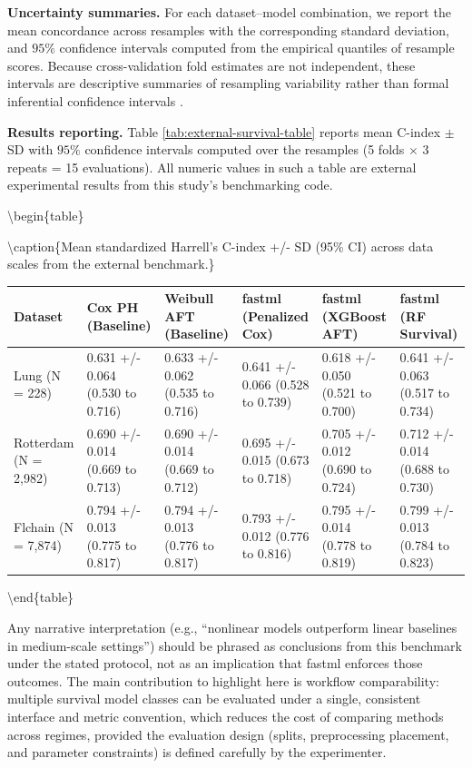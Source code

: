 \textbf{Uncertainty summaries.}
For each dataset--model combination, we report the mean concordance across resamples with the corresponding standard deviation, and \(95\%\) confidence intervals computed from the empirical quantiles of resample scores. Because cross-validation fold estimates are not independent, these intervals are descriptive summaries of resampling variability rather than formal inferential confidence intervals \citep{Bengio:2004aa}.

\textbf{Results reporting.}
Table \ref{tab:external-survival-table} reports mean C-index \(\pm\) SD with \(95\%\) confidence intervals computed over the resamples (5 folds \(\times\) 3 repeats = 15 evaluations). All numeric values in such a table are external experimental results from this study's benchmarking code.

\textbackslash begin\{table\}

\textbackslash caption\{\label{tab:external-survival-table}Mean standardized Harrell's C-index +/- SD (95\% CI) across data scales from the external benchmark.\}
\centering

\begin{tabular}[t]{llllll}
\toprule
Dataset & Cox PH (Baseline) & Weibull AFT (Baseline) & fastml (Penalized Cox) & fastml (XGBoost AFT) & fastml (RF Survival)\\
\midrule
Lung (N = 228) & 0.631 +/- 0.064 (0.530 to 0.716) & 0.633 +/- 0.062 (0.535 to 0.716) & 0.641 +/- 0.066 (0.528 to 0.739) & 0.618 +/- 0.050 (0.521 to 0.700) & 0.641 +/- 0.063 (0.517 to 0.734)\\
Rotterdam (N = 2,982) & 0.690 +/- 0.014 (0.669 to 0.713) & 0.690 +/- 0.014 (0.669 to 0.712) & 0.695 +/- 0.015 (0.673 to 0.718) & 0.705 +/- 0.012 (0.690 to 0.724) & 0.712 +/- 0.014 (0.688 to 0.730)\\
Flchain (N = 7,874) & 0.794 +/- 0.013 (0.775 to 0.817) & 0.794 +/- 0.013 (0.776 to 0.817) & 0.793 +/- 0.012 (0.776 to 0.816) & 0.795 +/- 0.014 (0.778 to 0.819) & 0.799 +/- 0.013 (0.784 to 0.823)\\
\bottomrule
\end{tabular}

\textbackslash end\{table\}

Any narrative interpretation (e.g., ``nonlinear models outperform linear baselines in medium-scale settings'') should be phrased as conclusions from this benchmark under the stated protocol, not as an implication that fastml enforces those outcomes. The main contribution to highlight here is workflow comparability: multiple survival model classes can be evaluated under a single, consistent interface and metric convention, which reduces the cost of comparing methods across regimes, provided the evaluation design (splits, preprocessing placement, and parameter constraints) is defined carefully by the experimenter.

